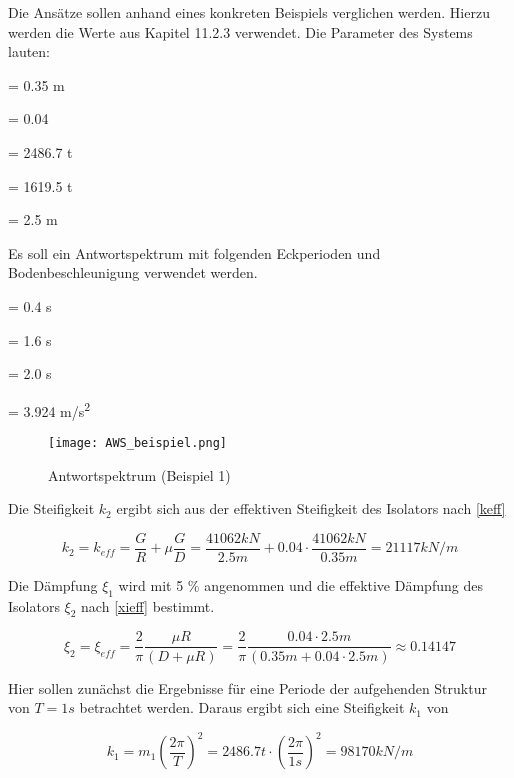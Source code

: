 Die Ansätze sollen anhand eines konkreten Beispiels verglichen werden. Hierzu werden die Werte aus \cite{Isemann} Kapitel 11.2.3 verwendet.
Die Parameter des Systems lauten:

    = 0.35 m \par
\makebox[1cm]{$\mu$}  = 0.04\par
{}  = 2486.7 t\par
{}  = 1619.5 t\par
{}    = 2.5 m\par

Es soll ein Antwortspektrum mit folgenden Eckperioden und Bodenbeschleunigung verwendet werden.

  = 0.4 s\par
{}  = 1.6 s\par
{}  = 2.0 s\par
{}  = 3.924 m/s\textsuperscript{2}\par

\begin{figure}[h]
    \centering
    \texttt{[image: AWS\_beispiel.png]}
    \caption{Antwortspektrum (Beispiel 1)}
\end{figure}

Die Steifigkeit $k_2$ ergibt sich aus der effektiven Steifigkeit des Isolators nach \cref{keff}

\begin{equation*}
k_2 = k_{eff} = \frac{G}{R} + \mu \frac{G}{D} = \frac{41062 kN}{2.5 m} + 0.04 \cdot \frac{41062 kN}{0.35 m} = 21117 kN/m
\end{equation*}

Die Dämpfung $\xi_1$ wird mit 5 \% angenommen und die effektive Dämpfung des Isolators $\xi_2$ nach \cref{xieff} bestimmt.

\begin{equation*}
\xi_2 = \xi_{eff} = \frac{2}{\pi} \frac{\mu R}{(D + \mu R)} = \frac{2}{\pi} \frac{0.04 \cdot 2.5 m}{(0.35 m + 0.04 \cdot 2.5 m)} \approx 0.14147
\end{equation*}

\pagebreak

Hier sollen zunächst die Ergebnisse für eine Periode der aufgehenden Struktur von $T = 1 s$ betrachtet werden. Daraus ergibt sich eine Steifigkeit $k_1$ von

\begin{equation*}
k_1 = m_1 (\frac{2 \pi}{T})^2 = 2486.7 t \cdot (\frac{2 \pi}{1 s})^2 = 98170 kN/m
\end{equation*}

